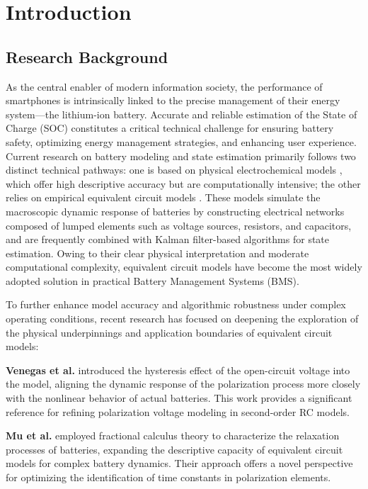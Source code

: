 \section{Introduction}
\subsection{Research Background}
As the central enabler of modern information society, the performance of smartphones is intrinsically linked to the precise 
management of their energy system—the lithium-ion battery. Accurate and reliable estimation of the State of Charge (SOC) 
constitutes a critical technical challenge for ensuring battery safety, optimizing energy management strategies, 
and enhancing user experience. Current research on battery modeling and state estimation primarily follows two distinct 
technical pathways: one is based on physical electrochemical models \cite{Zan2023}, which offer high descriptive accuracy 
but are computationally intensive; the other relies on empirical equivalent circuit models \cite{Guo2021, Zhao2022}. 
These models simulate the macroscopic dynamic response of batteries by constructing electrical networks composed of 
lumped elements such as voltage sources, resistors, and capacitors, and are frequently combined with Kalman 
filter-based algorithms \cite{Kalman1960} for state estimation. Owing to their clear physical interpretation 
and moderate computational complexity, equivalent circuit models have become the most widely adopted solution in 
practical Battery Management Systems (BMS).

To further enhance model accuracy and algorithmic robustness under complex operating conditions, recent research 
has focused on deepening the exploration of the physical underpinnings and application boundaries of equivalent circuit models:

\textbf{Venegas et al.} \cite{Venegas2022} introduced the hysteresis effect of the open-circuit voltage into the model, 
aligning the dynamic response of the polarization process more closely with the nonlinear behavior of actual batteries. 
This work provides a significant reference for refining polarization voltage modeling in second-order RC models.

\textbf{Mu et al.} \cite{Mu2017} employed fractional calculus theory to characterize the relaxation processes of batteries, 
expanding the descriptive capacity of equivalent circuit models for complex battery dynamics. Their approach offers a novel 
perspective for optimizing the identification of time constants in polarization elements.

